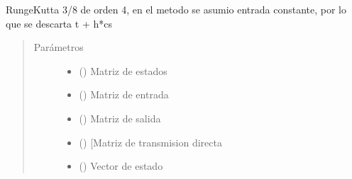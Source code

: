 \documentclass[letterpaper,10pt,spanish]{sphinxmanual}
\begin{document}
\begin{fulllineitems}
\label{\detokenize{codigos/rk_generator:rk_generator.tres_octavos4}}
Runge\sphinxhyphen{}Kutta 3/8 de orden 4, en el metodo se asumio entrada constante, por lo que se descarta t + h*cs
\begin{quote}\begin{description}
\item[{Parámetros}] \leavevmode\begin{itemize}
\item {} 
 (\sphinxstyleliteralemphasis{\sphinxupquote{, }}\sphinxstyleliteralemphasis{\sphinxupquote{, }}) \textendash{} Matriz de estados

\item {} 
 (\sphinxstyleliteralemphasis{\sphinxupquote{, }}\sphinxstyleliteralemphasis{\sphinxupquote{, }}) \textendash{} Matriz de entrada

\item {} 
 (\sphinxstyleliteralemphasis{\sphinxupquote{, }}\sphinxstyleliteralemphasis{\sphinxupquote{, }}) \textendash{} Matriz de salida

\item {} 
 (\sphinxstyleliteralemphasis{\sphinxupquote{, }}\sphinxstyleliteralemphasis{\sphinxupquote{, }}) \textendash{} {[}Matriz de transmision directa

\item {} 
 (\sphinxstyleliteralemphasis{\sphinxupquote{, }}\sphinxstyleliteralemphasis{\sphinxupquote{, }}) \textendash{} Vector de estado


\end{itemize}
\end{description}
\end{quote}
\end{fulllineitems}
\end{document}
